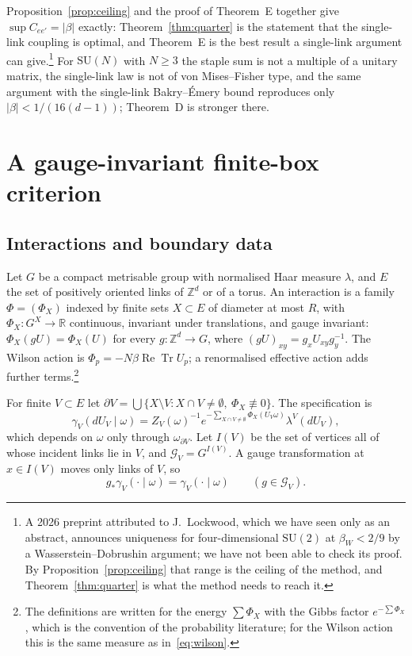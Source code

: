 \documentclass[aps,prd,twocolumn,superscriptaddress,nofootinbib,longbibliography,floatfix,amsmath,amssymb,10pt]{revtex4-2}
\theoremstyle{definition}
\theoremstyle{remark}
\newcommand{\R}{\mathbb{R}}
\newcommand{\Z}{\mathbb{Z}}
\newcommand{\SU}{\mathrm{SU}}
\newcommand{\ReTr}{\operatorname{Re}\operatorname{Tr}}
\begin{document}
Proposition~\ref{prop:ceiling} and the proof of Theorem~E together give
$\sup C_{ee'}=|\beta|$ exactly: Theorem~\ref{thm:quarter} is the statement
that the single-link coupling is optimal, and Theorem~E is the best result a
single-link argument can give.\footnote{A 2026 preprint attributed to
J.~Lockwood, which we have seen only as an abstract, announces uniqueness for
four-dimensional $\SU(2)$ at $\beta_W<2/9$ by a Wasserstein--Dobrushin
argument; we have not been able to check its proof. By
Proposition~\ref{prop:ceiling} that range is the ceiling of the method, and
Theorem~\ref{thm:quarter} is what the method needs to reach it.} For $\SU(N)$ with $N\ge3$ the staple sum is not a multiple
of a unitary matrix, the single-link law is not of von Mises--Fisher type, and
the same argument with the single-link Bakry--\'Emery bound reproduces only
$|\beta|<1/(16(d-1))$; Theorem~D is stronger there.

\section{A gauge-invariant finite-box criterion}\label{sec:box}

\subsection{Interactions and boundary data}

Let $G$ be a compact metrisable group with normalised Haar measure $\lambda$,
and $E$ the set of positively oriented links of $\Z^d$ or of a torus. An
interaction is a family $\Phi=(\Phi_X)$ indexed by finite sets $X\subset E$ of
diameter at most $R$, with $\Phi_X\colon G^X\to\R$ continuous, invariant under
translations, and gauge invariant: $\Phi_X(gU)=\Phi_X(U)$ for every
$g\colon\Z^d\to G$, where $(gU)_{xy}=g_xU_{xy}g_y^{-1}$. The Wilson action is
$\Phi_p=-N\beta\ReTr U_p$; a renormalised effective action adds further
terms.\footnote{The definitions are written for the energy $\sum\Phi_X$ with
the Gibbs factor $e^{-\sum\Phi_X}$, which is the convention of the
probability literature; for the Wilson action this is the same measure as
in~\eqref{eq:wilson}.}

For finite $V\subset E$ let $\partial V=\bigcup\{X\setminus V:X\cap V\ne
\emptyset,\ \Phi_X\not\equiv0\}$. The specification is
\[
\gamma_V(dU_V\mid\omega)=Z_V(\omega)^{-1}e^{-\sum_{X\cap V\ne\emptyset}
\Phi_X(U_V\omega)}\lambda^V(dU_V),
\]
which depends on $\omega$ only through $\omega_{\partial V}$. Let $I(V)$ be the
set of vertices all of whose incident links lie in $V$, and
$\mathcal G_V=G^{I(V)}$. A gauge transformation at $x\in I(V)$ moves only links
of $V$, so
\begin{equation}\label{eq:interiorinv}
g_*\gamma_V(\cdot\mid\omega)=\gamma_V(\cdot\mid\omega)\qquad(g\in\mathcal
G_V).
\end{equation}
\end{document}

